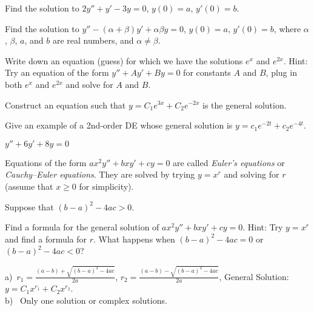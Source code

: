 \begin{exercise}\ansMark%
Find the solution to
$2y''+y'-3y=0$, $y(0) = a$, $y'(0)=b$.
\end{exercise}

\begin{exercise}\ansMark%
Find the solution to
$y''-(\alpha+\beta) y' + \alpha \beta y=0$, $y(0) = a$, $y'(0)=b$,
where $\alpha$, $\beta$, $a$, and $b$ are real numbers, and $\alpha \not=
\beta$.
\end{exercise}

\begin{exercise}\ansMark%
Write down an equation (guess) for which we have the solutions
$e^x$ and $e^{2x}$.  Hint: Try an equation of the form
$y''+Ay'+By = 0$ for constants $A$ and $B$,
plug in both $e^x$ and $e^{2x}$ and solve for $A$ and $B$.
\end{exercise}

\begin{exercise}\ansMark%
Construct an equation such that $y = C_1 e^{3x} + C_2 e^{-2x}$ is the general
solution.
\end{exercise}

\begin{exercise}
Give an example of a 2nd-order DE whose general solution is $y=c_1e^{-2t}+c_2e^{-4t}$.
\end{exercise}
\comboSol{%
}
{%
$y'' + 6y' + 8y = 0$
}

\pagebreak[2]
Equations of the form $a x^2 y'' + b x y' + c y = 0$ are called
\emph{Euler's equations} or
\emph{Cauchy--Euler equations}.
They are solved by trying
$y=x^r$ and solving for $r$ (assume that $x \geq 0$ for simplicity).

\begin{exercise} \label{sol:eulerex}
\pagebreak[2]
Suppose that ${(b-a)}^2-4ac > 0$.
\begin{tasks}
\task Find a formula for the general solution
of $a x^2 y'' + b x y' + c y = 0$.  Hint: Try $y=x^r$ and find a formula for
$r$.
\task What happens when ${(b-a)}^2-4ac = 0$ or ${(b-a)}^2-4ac < 0$?
\end{tasks}
\end{exercise}
\comboSol{%
}
{%
a)~$r_1 = \frac{(a-b) + \sqrt{(b-a)^2 - 4ac}}{2a}$, $r_2 = \frac{(a-b) - \sqrt{(b-a)^2 - 4ac}}{2a}$, General Solution: $y = C_1x^{r_1} + C_2x^{r_2}$. \\
b)~ Only one solution or complex solutions.
}

